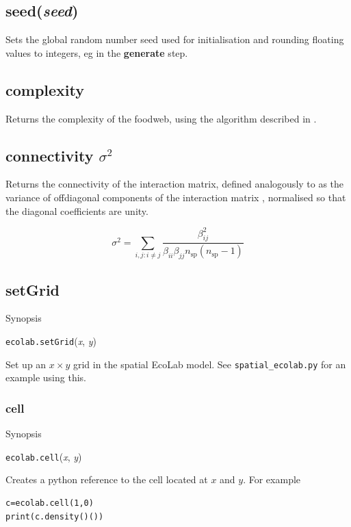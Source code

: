 \documentclass{article}
\newcommand{\bbeta}{\mbox{\boldmath{$\beta$}}}   %
\begin{document}
\subsection{seed({\em seed})}

Sets the global random number seed used for initialisation and
rounding floating values to integers, eg in the {\bf generate} step.

\subsection{complexity}

Returns the complexity of the foodweb, using the algorithm described
in \cite{Standish10b}.

\subsection{connectivity $\sigma^2$}

Returns the connectivity of the interaction matrix, defined
analogously to \cite{May72} as the variance of offdiagonal components
of the interaction matrix \bbeta, normalised so that the diagonal
coefficients are unity.

\begin{equation}
  \sigma^2=\sum_{i,j: i\ne j} \frac{\beta_{ij}^2}{\beta_{ii}\beta_{jj}n_\mathrm{sp}(n_\mathrm{sp}-1)}
\end{equation}
\subsection{setGrid}

Synopsis

{\tt ecolab.setGrid}({\em x}, {\em y})

\noindent Set up an $x\times y$ grid in the spatial EcoLab model. See
\verb+spatial_ecolab.py+ for an example using this.

\subsubsection{cell}

Synopsis

{\tt ecolab.cell}({\em x}, {\em y})

\noindent Creates a python reference to the cell located at $x$ and
$y$. For example
\begin{verbatim}
c=ecolab.cell(1,0)
print(c.density()())
\end{verbatim}
\end{document}
